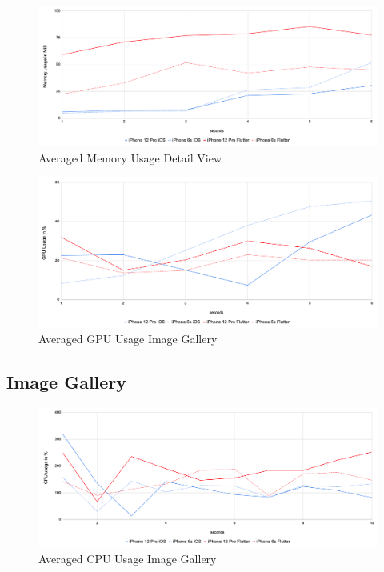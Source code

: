 \begin{figure}[!h]
    \centering
    \includegraphics[width=\linewidth]{images/performance_results/detail_view/avg_memory_usage_detail_view.png}
    \caption{Averaged Memory Usage Detail View}
    \label{fig:avg_memory_usage_detail_view}
\end{figure}

\begin{figure}[!h]
    \centering
    \includegraphics[width=\linewidth]{images/performance_results/detail_view/avg_gpu_usage_detail_view.png}
    \caption{Averaged GPU Usage Image Gallery}
    \label{fig:avg_gpu_usage_image_gallery}
\end{figure}



\subsection{Image Gallery}
\begin{figure}[!h]
    \centering
    \includegraphics[width=\linewidth]{images/performance_results/image_gallery/avg_cpu_usage_image_gallery.png}
    \caption{Averaged CPU Usage Image Gallery}
    \label{fig:avg_cpu_usage_image_gallery}
\end{figure}

